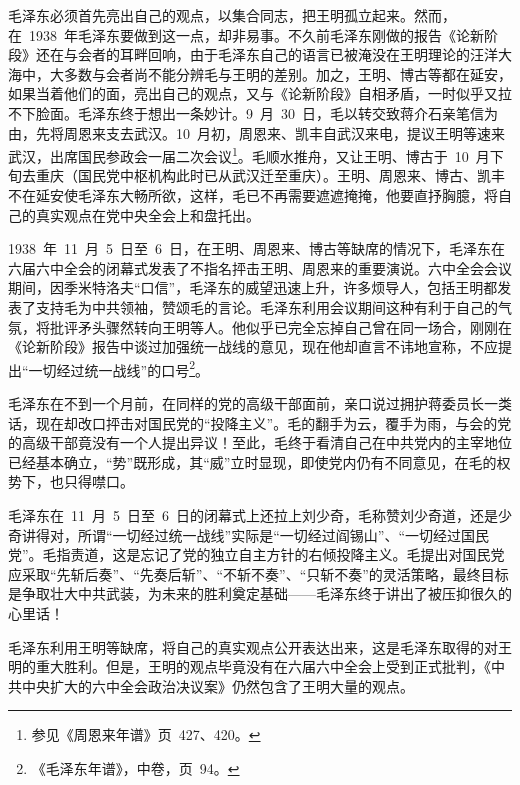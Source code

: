 毛泽东必须首先亮出自己的观点，以集合同志，把王明孤立起来。然而，在~1938~年毛泽东要做到这一点，却非易事。不久前毛泽东刚做的报告《论新阶段》还在与会者的耳畔回响，由于毛泽东自己的语言已被淹没在王明理论的汪洋大海中，大多数与会者尚不能分辨毛与王明的差别。加之，王明、博古等都在延安，如果当着他们的面，亮出自己的观点，又与《论新阶段》自相矛盾，一时似乎又拉不下脸面。毛泽东终于想出一条妙计。9~月~30~日，毛以转交致蒋介石亲笔信为由，先将周恩来支去武汉。10~月初，周恩来、凯丰自武汉来电，提议王明等速来武汉，出席国民参政会一届二次会议\footnote{参见《周恩来年谱》页~427、420。}。毛顺水推舟，又让王明、博古于~10~月下旬去重庆（国民党中枢机构此时已从武汉迁至重庆）。王明、周恩来、博古、凯丰不在延安使毛泽东大畅所欲，这样，毛已不再需要遮遮掩掩，他要直抒胸臆，将自己的真实观点在党中央全会上和盘托出。

1938~年~11~月~5~日至~6~日，在王明、周恩来、博古等缺席的情况下，毛泽东在六届六中全会的闭幕式发表了不指名抨击王明、周恩来的重要演说。六中全会会议期间，因季米特洛夫“口信”，毛泽东的威望迅速上升，许多烦导人，包括王明都发表了支持毛为中共领袖，赞颂毛的言论。毛泽东利用会议期间这种有利于自己的气氛，将批评矛头骤然转向王明等人。他似乎已完全忘掉自己曾在同一场合，刚刚在《论新阶段》报告中谈过加强统一战线的意见，现在他却直言不讳地宣称，不应提出“一切经过统一战线”的口号\footnote{《毛泽东年谱》，中卷，页~94。}。

毛泽东在不到一个月前，在同样的党的高级干部面前，亲口说过拥护蒋委员长一类话，现在却改口抨击对国民党的“投降主义”。毛的翻手为云，覆手为雨，与会的党的高级干部竟没有一个人提出异议！至此，毛终于看清自己在中共党内的主宰地位已经基本确立，“势”既形成，其“威”立时显现，即使党内仍有不同意见，在毛的权势下，也只得噤口。

毛泽东在~11~月~5~日至~6~日的闭幕式上还拉上刘少奇，毛称赞刘少奇道，还是少奇讲得对，所谓“一切经过统一战线”实际是“一切经过阎锡山”、“一切经过国民党”。毛指责道，这是忘记了党的独立自主方针的右倾投降主义。毛提出对国民党应采取“先斩后奏”、“先奏后斩”、“不斩不奏”、“只斩不奏”的灵活策略，最终目标是争取壮大中共武装，为未来的胜利奠定基础——毛泽东终于讲出了被压抑很久的心里话！

毛泽东利用王明等缺席，将自己的真实观点公开表达出来，这是毛泽东取得的对王明的重大胜利。但是，王明的观点毕竟没有在六届六中全会上受到正式批判，《中共中央扩大的六中全会政治决议案》仍然包含了王明大量的观点。

